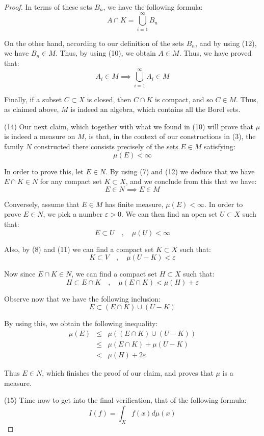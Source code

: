 \documentclass[10pt,a4paper]{amsart}
\begin{document}
\begin{proof}
In terms of these sets $B_n$, we have the following formula:
$$A\cap K=\bigcup_{i=1}^\infty B_n$$

On the other hand, according to our definition of the sets $B_n$, and by using (12), we have $B_n\in M$. Thus, by using (10), we obtain $A\in M$. Thus, we have proved that:
$$A_i\in M\implies \bigcup_{i=1}^\infty A_i\in M$$

Finally, if a subset $C\subset X$ is closed, then $C\cap K$ is compact, and so $C\in M$. Thus, as claimed above, $M$ is indeed an algebra, which contains all the Borel sets.

\medskip

(14) Our next claim, which together with what we found in (10) will prove that $\mu$ is indeed a measure on $M$, is that, in the context of our constructions in (3), the family $N$ constructed there consists precisely of the sets $E\in M$ satisfying:
$$\mu(E)<\infty$$

In order to prove this, let $E\in N$. By using (7) and (12) we deduce that we have $E\cap K\in N$ for any compact set $K\subset X$, and we conclude from this that we have:
$$E\in N\implies E\in M$$

Conversely, assume that $E\in M$ has finite measure, $\mu(E)<\infty$. In order to prove $E\in N$, we pick a number $\varepsilon>0$. We can then find an open set $U\subset X$ such that:
$$E\subset U\quad,\quad\mu(U)<\infty$$

Also, by (8) and (11) we can find a compact set $K\subset X$ such that:
$$K\subset V\quad,\quad\mu(U-K)<\varepsilon$$

Now since $E\cap K\in N$, we can find a compact set $H\subset X$ such that:
$$H\subset E\cap K\quad,\quad\mu(E\cap K)<\mu(H)+\varepsilon$$

Observe now that we have the following inclusion:
$$E\subset(E\cap K)\cup(U-K)$$

By using this, we obtain the following inequality:
\begin{eqnarray*}
\mu(E)
&\leq&\mu\left((E\cap K)\cup(U-K)\right)\\
&\leq&\mu(E\cap K)+\mu(U-K)\\
&<&\mu(H)+2\varepsilon
\end{eqnarray*}

Thus $E\in N$, which finishes the proof of our claim, and proves that $\mu$ is a measure.

\medskip

(15) Time now to get into the final verification, that of the following formula:
$$I(f)=\int_Xf(x)d\mu(x)$$


\end{proof}
\end{document}
